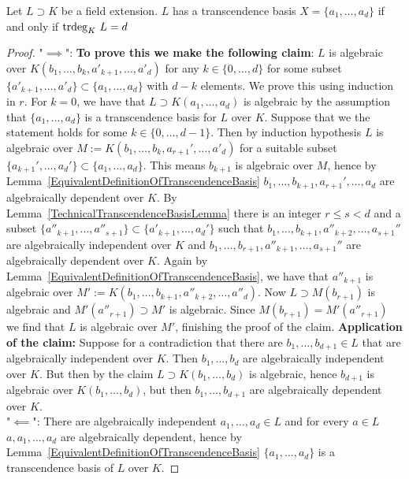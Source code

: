 \begin{theorem}\label{CardinalityOfTranscendenceBasisIsEqualToTranscendenceDegree}
    Let $L\supset K$ be a field extension. $L$ has a transcendence basis $X=\{a_1,\dots, a_d\}$ if and only if $\mathrm{trdeg }_K \ L = d$
\end{theorem}
\begin{proof}
    "$\implies$": 
    \textbf{To prove this we make the following claim}: $L$ is algebraic over $K(b_1,\dots,b_{k}, a'_{k+1},\dots,a'_{d})$ for any $k\in \{0,\dots,d\}$ for some subset $\{a'_{k+1},\dots,a'_{d}\}\subset \{a_1,\dots,a_d\}$ with $d-k$ elements.  We prove this using induction in $r$. For $k=0$, we have that $L\supset K(a_1,\dots,a_d)$ is algebraic by the assumption that $\{a_1,\dots,a_d\}$ is a transcendence basis for $L$ over $K$. Suppose that we the statement holds for some $k\in\{0,\dots,d-1\}$. Then by induction hypothesis $L$ is algebraic over $M := K(b_1,\dots,b_k,a_{r+1}',\dots,a'_d)$ for a suitable subset $\{a_{k+1}',\dots,a_{d}'\}\subset \{a_1,\dots,a_d\}$. This means $b_{k+1}$ is algebraic over $M$, hence by Lemma~\ref{EquivalentDefinitionOfTranscendenceBasis} $b_1,\dots,b_{k+1},a_{r+1}',\dots,a_d$ are algebraically dependent over $K$. By Lemma~\ref{TechnicalTranscendenceBasisLemma} there is an integer $r\leq s<d$ and a subset $\{a''_{k+1},\dots,a''_{s+1}\}\subset \{a'_{k+1},\dots,a_{d}'\}$ such that $b_1,\dots,b_{k+1},a''_{k+2},\dots,a_{s+1}''$ are algebraically independent over $K$ and $b_1,\dots,b_{r+1},a''_{k+1},\dots,a_{s+1}''$ are algebraically dependent over $K$. Again by Lemma~\ref{EquivalentDefinitionOfTranscendenceBasis}, we have that $a''_{k+1}$ is algebraic over $M':= K(b_1,\dots,b_{k+1},a''_{k+2},\dots,a''_d)$. Now $L\supset M(b_{r+1})$ is algebraic and $M'(a''_{r+1})\supset M'$ is algebraic. Since $M(b_{r+1})=M'(a''_{r+1})$ we find that $L$ is algebraic over $M'$, finishing the proof of the claim.
    \textbf{Application of the claim:} Suppose for a contradiction that there are $b_1,\dots,b_{d+1}\in L$ that are algebraically independent over $K$. Then $b_1,\dots,b_d$ are algebraically independent over $K$. But then by the claim $L\supset K(b_1,\dots,b_d)$ is algebraic, hence $b_{d+1}$ is algebraic over $K(b_1,\dots,b_d)$, but then $b_1,\dots,b_{d+1}$ are algebraically dependent over $K$.\\ 
    "$\impliedby$": There are algebraically independent $a_1,\dots,a_d \in L$ and for every $a\in L$ $a,a_1,\dots,a_d$ are algebraically dependent, hence by Lemma~\ref{EquivalentDefinitionOfTranscendenceBasis} $\{a_1,\dots,a_d\}$ is a transcendence basis of $L$ over $K$.
\end{proof}
